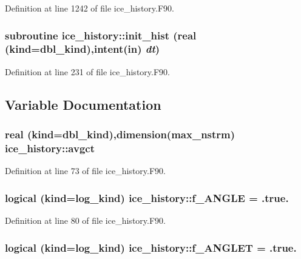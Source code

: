 Definition at line 1242 of file ice\_\-history.F90.\hypertarget{namespaceice__history_a99fbe7f0b61b42e909dad8bfff950536}{
\subsubsection[{init\_\-hist}]{\setlength{\rightskip}{0pt plus 5cm}subroutine ice\_\-history::init\_\-hist (real (kind=dbl\_\-kind),intent(in) {\em dt})}}
\label{namespaceice__history_a99fbe7f0b61b42e909dad8bfff950536}


Definition at line 231 of file ice\_\-history.F90.

\subsection{Variable Documentation}
\hypertarget{namespaceice__history_a8f63bda9e9e4d0a76e49e17002210ae4}{
\subsubsection[{avgct}]{\setlength{\rightskip}{0pt plus 5cm}real (kind=dbl\_\-kind),dimension(max\_\-nstrm) {\bf ice\_\-history::avgct}}}
\label{namespaceice__history_a8f63bda9e9e4d0a76e49e17002210ae4}


Definition at line 73 of file ice\_\-history.F90.\hypertarget{namespaceice__history_ae355872badcbed142dd282929330dae7}{
\subsubsection[{f\_\-ANGLE}]{\setlength{\rightskip}{0pt plus 5cm}logical (kind=log\_\-kind) {\bf ice\_\-history::f\_\-ANGLE} = .true.}}
\label{namespaceice__history_ae355872badcbed142dd282929330dae7}


Definition at line 80 of file ice\_\-history.F90.\hypertarget{namespaceice__history_a31c241b97efeccd9b191577aa4bf3b4a}{
\subsubsection[{f\_\-ANGLET}]{\setlength{\rightskip}{0pt plus 5cm}logical (kind=log\_\-kind) {\bf ice\_\-history::f\_\-ANGLET} = .true.}}
\label{namespaceice__history_a31c241b97efeccd9b191577aa4bf3b4a}


